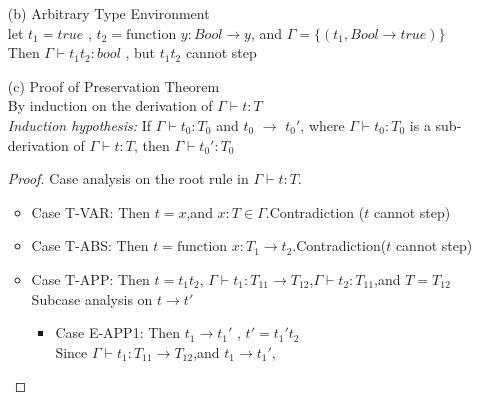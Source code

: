 \documentclass{article}
\begin{document}
\begin{description}
\begin{enumerate}
\begin{proof}
\begin{itemize}
\begin{itemize}
                                        Then $t \rightarrow t' = v_1 t_2'$ by E-APP2
                                    \item Case Both $t_1$ and $t_2$ are values\\
                                        Then, $t \rightarrow t' = [x \rightarrow v_2]t_{12}$ by E-APPBETA
                                \end{itemize}
                        \end{itemize}
                    \end{proof}
                \item[(b)]{Arbitrary Type Environment}\\ let $t_1 = true$ , $t_2 = \text{function \ } y:Bool \rightarrow y $, and $\Gamma = \{(t_1,Bool \rightarrow true)\}$\\
                   Then $\Gamma \vdash t_1 t_2: bool$ , but $t_1 t_2$ cannot step
                \item[(c)]{Proof of Preservation Theorem}\\
                    By induction on the derivation of $\Gamma \vdash t:T$\\
                    \textit{Induction hypothesis:} If $\Gamma \vdash t_0:T_0$ and $t_0$ $\rightarrow$ $t_0'$, where $\Gamma \vdash t_0:T_0$ is a sub-derivation of $\Gamma \vdash t:T$, then $\Gamma \vdash t_0':T_0$
                    \begin{proof}
                        Case analysis on the root rule in $\Gamma \vdash t:T$.
                        \begin{itemize}
                            \item Case T-VAR: Then $t = x$,and $x:T \in \Gamma$.Contradiction ($t$ cannot step)
                            \item Case T-ABS: Then $t = \text{function\ } x:T_1 \rightarrow t_2 $.Contradiction($t$ cannot step)
                            \item Case T-APP: Then $t = t_1 t_2$, $\Gamma \vdash t_1: T_{11} \rightarrow T_{12}$,\space  $\Gamma \vdash t_2:T_{11}$,\space and $T=T_{12}$\\
                            Subcase analysis on $t \rightarrow t'$
                            \begin{itemize}
                                \item Case E-APP1: Then $t_1 \rightarrow t_1'$ , $t' = t_1't_2$\\
                                    Since $\Gamma \vdash t_1:T_{11} \rightarrow T_{12}$,and $t_1 \rightarrow t_1'$,\\

\end{itemize}
\end{itemize}
\end{proof}
\end{enumerate}
\end{description}
\end{document}
